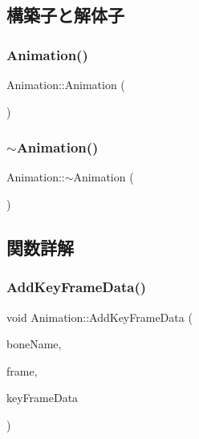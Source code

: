 \subsection{構築子と解体子}
\mbox{\label{class_animation_a83f0a16cef7117f187ad596de38dd9d6}} 
\subsubsection{\texorpdfstring{Animation()}{Animation()}}
{\footnotesize\ttfamily Animation\+::\+Animation (\begin{DoxyParamCaption}{ }\end{DoxyParamCaption})}

\mbox{\label{class_animation_a401b68793d4fbf48d481c030ee4b2a16}} 
\subsubsection{\texorpdfstring{$\sim$\+Animation()}{~Animation()}}
{\footnotesize\ttfamily Animation\+::$\sim$\+Animation (\begin{DoxyParamCaption}{ }\end{DoxyParamCaption})}



\subsection{関数詳解}
\mbox{\label{class_animation_a196d6edb1f31ae063d0163cab2c77171}} 
\subsubsection{\texorpdfstring{Add\+Key\+Frame\+Data()}{AddKeyFrameData()}}
{\footnotesize\ttfamily void Animation\+::\+Add\+Key\+Frame\+Data (\begin{DoxyParamCaption}\item[{const std\+::wstring \&}]{bone\+Name,  }\item[{int}]{frame,  }\item[{const \mbox{\hyperlink{struct_key_frame_data}{Key\+Frame\+Data}} \&}]{key\+Frame\+Data }\end{DoxyParamCaption})}



